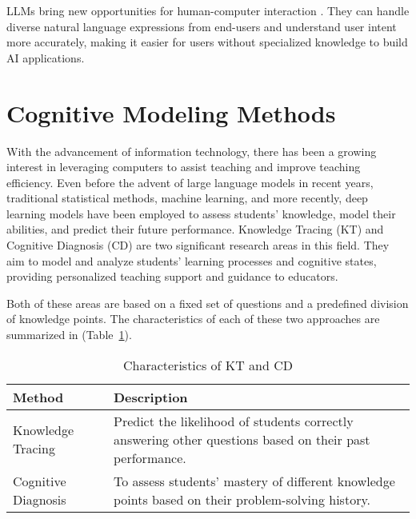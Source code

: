 \begin{survey}
LLMs bring new opportunities for human-computer interaction \cite{bommasani2021opportunities}. They can handle diverse natural language expressions from end-users and understand user intent more accurately, making it easier for users without specialized knowledge to build AI applications. 

\section{Cognitive Modeling Methods}

With the advancement of information technology, there has been a growing interest in leveraging computers to assist teaching and improve teaching efficiency. Even before the advent of large language models in recent years, traditional statistical methods, machine learning, and more recently, deep learning models have been employed to assess students' knowledge, model their abilities, and predict their future performance. Knowledge Tracing (KT) and Cognitive Diagnosis (CD) are two significant research areas in this field. They aim to model and analyze students' learning processes and cognitive states, providing personalized teaching support and guidance to educators.

Both of these areas are based on a fixed set of questions and a predefined division of knowledge points. The characteristics of each of these two approaches are summarized in (Table~\ref{tab:appendix-survey-table}).

\begin{table}
  \centering
  \caption{Characteristics of KT and CD}
  \begin{tabular}{p{0.25\linewidth}p{0.75\linewidth}}
    \toprule
    Method                & Description             \\
    \midrule
    Knowledge Tracing     & Predict the likelihood of students correctly answering other questions based on their past performance.    \\
    Cognitive Diagnosis   & To assess students' mastery of different knowledge points based on their problem-solving history.        \\
    \bottomrule
  \end{tabular}
  \label{tab:appendix-survey-table}
\end{table}


\end{survey}
